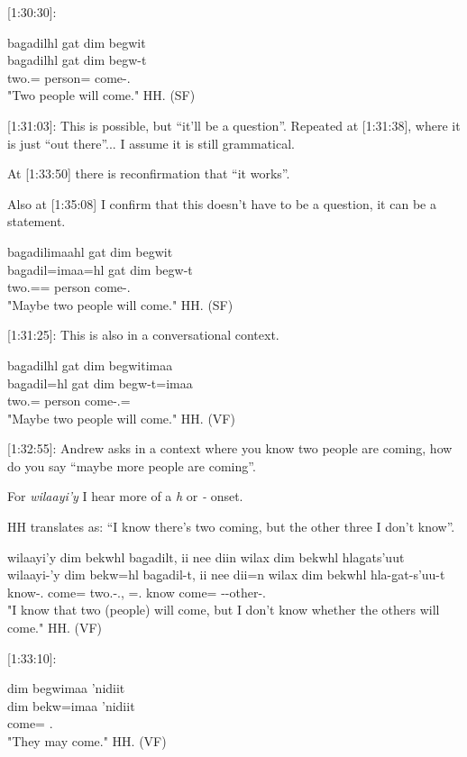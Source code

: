 [1:30:30]:

\begin{exe}
    \ex \glll
    bag̱adilhl gat dim begwit \\
    bag̱adilhl gat dim begw-t \\
    two.\Hum{}=\Cn{} person= \Prosp{} come-\Tsg{}.\Ii{} \\
    \glt "Two people will come." \hfill HH.\ElicitationDate{} (SF)
\end{exe}

[1:31:03]: This is possible, but ``it'll be a question''. Repeated at [1:31:38], where it is just ``out there''... I assume it is still grammatical. 

At [1:33:50] there is reconfirmation that ``it works''.

Also at [1:35:08] I confirm that this doesn't have to be a question, it can be a statement.

\begin{exe}
    \ex \glll
    bag̱adilimaahl gat dim begwit \\
    bag̱adil=imaa=hl gat dim begw-t \\
    two.\Hum{}=\Epis{}=\Cn{} person \Prosp{} come-\Tsg{}.\Ii{} \\
    \glt "Maybe two people will come." \hfill HH.\ElicitationDate{} (SF)
\end{exe}

[1:31:25]: This is also in a conversational context.

\begin{exe}
    \ex \glll
    bag̱adilhl gat dim begwitimaa \\
    bag̱adil=hl gat dim begw-t=imaa \\
    two.\Hum{}=\Cn{} person \Prosp{} come-\Tsg{}.\Ii{}=\Epis{} \\
    \glt "Maybe two people will come." \hfill HH.\ElicitationDate{} (VF)
\end{exe}

[1:32:55]: Andrew asks in a context where you know two people are coming, how do you say ``maybe more people are coming''.

For \textit{wilaayi'y} I hear more of a \textit{h} or \textit{\emptyset-} onset.

HH translates as: ``I know there's two coming, but the other three I don't know''.

\begin{exe}
    \ex \glll
    wilaayi'y dim bekwhl bag̱adilt, ii nee diin wilax dim bekwhl hlag̱ats'uut \\
    wilaayi-'y dim bekw=hl bag̱adil-t, ii nee dii=n wilax dim bekwhl hla-g̱at-s'uu-t\\
    know-\Fsg{}.\Ii{} \Prosp{} come=\Cn{} two.\Hum{}-\Tsg{}.\Ii{}, \Ccnj{} \Neg{} \Foc{}=\Fsg{}.\I{} know \Prosp{} come=\Cn{} \Part{}-\Distr{}-other-\Tsg{}.\Ii{} \\
    \glt "I know that two (people) will come, but I don't know whether the others will come." \hfill HH.\ElicitationDate{} (VF)
\end{exe}

[1:33:10]:

\begin{exe}
    \ex \glll
    dim begwimaa 'nidiit \\
    dim bekw=imaa 'nidiit \\
    \Prosp{} come=\Epis{} \Tpl{}.\Iii{} \\
    \glt "They may come." \hfill HH.\ElicitationDate{} (VF)
\end{exe}